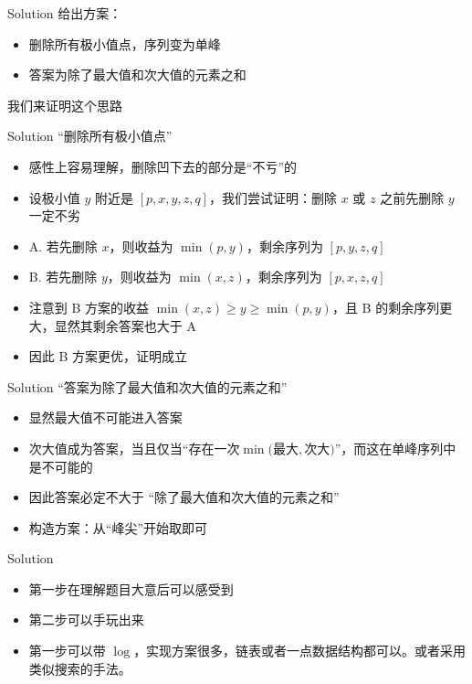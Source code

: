 ﻿\documentclass[aspectratio=169,handout]{ctexbeamer}
\begin{document}
\begin{frame}{Solution}
    给出方案：
    \pause 
    \begin{itemize}
        \item 删除所有极小值点，序列变为单峰
        \item 答案为除了最大值和次大值的元素之和
    \end{itemize}
    我们来证明这个思路


\end{frame}

\begin{frame}{Solution}
    “删除所有极小值点”
    \pause
    \begin{itemize}
        \item 感性上容易理解，删除凹下去的部分是“不亏”的
        \pause
        \item 设极小值 $y$ 附近是 $[p,x,y,z,q]$，我们尝试证明：删除 $x$ 或 $z$ 之前先删除 $y$ 一定不劣
        \pause
        \item A. 若先删除 $x$，则收益为 $\min(p,y)$，剩余序列为 $[p,y,z,q]$
        \item B. 若先删除 $y$，则收益为 $\min(x,z)$，剩余序列为 $[p,x,z,q]$
        \pause
        \item 注意到 B 方案的收益 $\min(x,z)\ge y\ge \min(p,y)$，且 B 的剩余序列更大，显然其剩余答案也大于 A
        \item 因此 B 方案更优，证明成立
    \end{itemize}
\end{frame}

\begin{frame}{Solution}
    “答案为除了最大值和次大值的元素之和”
    \pause
    \begin{itemize}
        \item 显然最大值不可能进入答案
        \pause
        \item 次大值成为答案，当且仅当“存在一次$\min($最大$,$次大$)$”，而这在单峰序列中是不可能的
        \pause
        \item 因此答案必定不大于 “除了最大值和次大值的元素之和”
        \item 构造方案：从“峰尖”开始取即可
    \end{itemize}
\end{frame}


\begin{frame}{Solution}
    \begin{itemize}
        \item 第一步在理解题目大意后可以感受到
        \item 第二步可以手玩出来
        \item 第一步可以带 $\log$，实现方案很多，链表或者一点数据结构都可以。或者采用类似搜索的手法。
    \end{itemize}
\end{frame}
\end{document}
